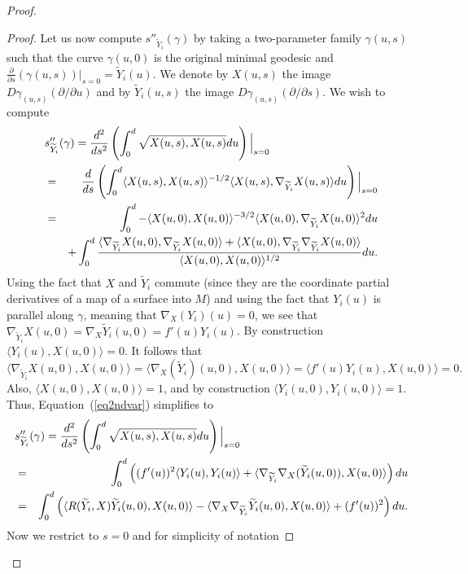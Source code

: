 \begin{proof}
\begin{proof}
Let us now compute $s''_{\widetilde Y_i}(\gamma)$ by taking a
two-parameter family $\gamma(u,s)$ such that the curve $\gamma(u,0)$
is the original minimal geodesic and $\frac{\partial}{\partial
s}(\gamma(u,s))|_{s=0}=\widetilde Y_i(u)$.  We denote by $X(u,s)$
the image $D\gamma_{(u,s)}(\partial/\partial u)$ and by $\widetilde
Y_i(u,s)$ the image $D\gamma_{(u,s)}(\partial/\partial s)$. We wish
to compute
\begin{eqnarray}
\lefteqn{s''_{\widetilde Y_i}(\gamma) =
\frac{d^2}{ds^2}\left(\int_0^d\sqrt{X(u,s),X(u,s)}du\right)\Bigl|_{s=0}\Bigr.}
& &
 \nonumber \\
& = & \frac{d}{ds}\left(\int_0^d\langle X(u,s),X(u,s)\rangle^{-1/2}
\langle
X(u,s),\nabla_{\widetilde Y_i}X(u,s)\rangle du\right)\Bigl|_{s=0}\Bigr. \nonumber \\
& = &  \int_0^d-\langle X(u,0),X(u,0)\rangle^{-3/2}\langle
X(u,0),\nabla_{\widetilde
Y_i}X(u,0)\rangle^2du \label{eq2ndvar} \\
& &  +\int_0^d\frac{\langle \nabla_{\widetilde
Y_i}X(u,0),\nabla_{\widetilde Y_i}X(u,0)\rangle +\langle
X(u,0),\nabla_{\widetilde Y_i}\nabla_{\widetilde
Y_i}X(u,0)\rangle}{\langle X(u,0),X(u,0)\rangle^{1/2}}du \nonumber.
\end{eqnarray}
Using the fact that $X$ and $\widetilde Y_i$ commute (since they are
the coordinate partial derivatives of a map of a surface into $M$)
and using the fact that $Y_i(u)$ is parallel along $\gamma$, meaning
that $\nabla_X(Y_i)(u)=0$, we see that $\nabla_{\widetilde
Y_i}X(u,0)=\nabla_X\widetilde Y_i(u,0)=f'(u)Y_i(u)$. By construction
$\langle Y_i(u),X(u,0)\rangle=0$. It follows that
$$\langle \nabla_{\widetilde Y_i}X(u,0),X(u,0)\rangle=\langle \nabla_X(\widetilde
Y_i)(u,0),X(u,0)\rangle = \langle f'(u)Y_i(u),X(u,0)\rangle =0.$$
Also, $\langle X(u,0),X(u,0)\rangle=1$, and by construction $\langle
Y_i(u,0),Y_i(u,0)\rangle=1$. Thus, Equation~(\ref{eq2ndvar})
simplifies to
\begin{eqnarray}
\lefteqn{s''_{\widetilde
Y_i}(\gamma)=\frac{d^2}{ds^2}\left(\int_0^d\sqrt{X(u,s),X(u,s)}du\right)\Bigl|_{s=0}\Bigr.
 \label{2ndvaria}}
\\& = & \int_0^d\left((f'(u))^2\langle
Y_i(u),Y_i(u)\rangle+\langle \nabla_{\widetilde
Y_i}\nabla_X(\widetilde
Y_i(u,0)),X(u,0)\rangle\right)du \nonumber\\
& = & \int_0^d\left(\langle R(\widetilde Y_i,X)\widetilde
Y_i(u,0),X(u,0)\rangle-\langle \nabla_X\nabla_{\widetilde
Y_i}\widetilde Y_i(u,0),X(u,0)\rangle+(f'(u))^2\right)
du.\nonumber\end{eqnarray} Now we restrict to $s=0$ and for simplicity of notation

\end{proof}
\end{proof}
